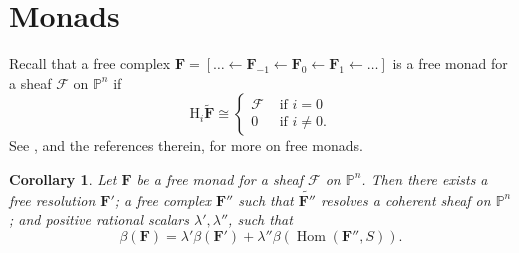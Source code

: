 \documentclass[12pt]{amsart}
\newtheorem{cor}[lemma]{Corollary}
\theoremstyle{definition}
\theoremstyle{remark}
\newcommand{\Hom}{\operatorname{Hom}} %
\newcommand{\PP}{\mathbb{P}}
\newcommand{\HH}{\mathrm{H}}
\newcommand{\cF}{\mathcal{F}}
\newcommand{\FF}{\mathbf{F}}
\newcommand{\defi}[1]{\textsf{#1}} %
\begin{document}
\section{Monads}\label{sec:examples}

Recall that a free complex $\FF=[\dots \gets \FF_{-1}\gets \FF_0\gets \FF_1\gets \dots]$ is a \defi{free monad} for a sheaf $\cF$ on $\PP^{n}$ if 
$$
\HH_i\widetilde{\FF}\cong
\begin{cases}                    \cF&\text{ if } i=0\\
					0 &\text{ if } i\neq 0.
\end{cases}
$$					
See \cite[\S8]{eis-floy-schrey}, and the references therein, for more on free monads.  
\begin{cor}\label{cor:monads}
Let $\FF$ be a free monad for a sheaf $\cF$ on $\PP^n$.  Then there exists a free resolution $\FF'$; a free complex $\FF''$ such that $\widetilde{\FF''}$ resolves a coherent sheaf on $\PP^n$; and positive rational scalars $\lambda', \lambda''$, such that
\[
\beta(\FF)=\lambda'\beta(\FF')+\lambda''\beta(\Hom(\FF'',S)).
\]
\end{cor}
\end{document}

